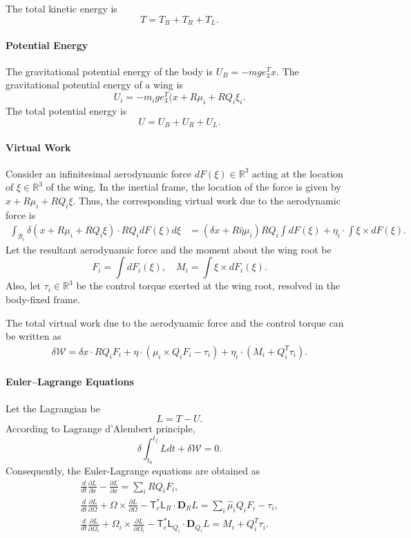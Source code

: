 \documentclass[10pt]{article}
\newcommand{\deriv}[2]{\ensuremath{\frac{\partial #1}{\partial #2}}}
\newcommand{\T}{\ensuremath{\mathsf{T}}}
\renewcommand{\L}{\ensuremath{\mathsf{L}}}
\renewcommand{\Re}{\ensuremath{\mathbb{R}}}
\newcommand{\D}{\ensuremath{\mathbf{D}}}
\begin{document}
The total kinetic energy is
\[
    T = T_B + T_R + T_L.
\]

\paragraph{Potential Energy}

The gravitational potential energy of the body is $U_B = -m g e_3^T x$. 
The gravitational potential energy of a wing is
\[
    U_i = -m_ig e_3^T (x + R\mu_i + RQ_i \xi_i.
\]
The total potential energy is
\[
    U = U_B + U_R + U_L.
\]

\paragraph{Virtual Work}

Consider an infinitesimal aerodynamic force $dF(\xi)\in\Re^3$ acting at the location of $\xi\in\Re^3$ of the wing. 
In the inertial frame, the location of the force is given by $x+ R\mu_i + R Q_i\xi$. 
Thus, the corresponding virtual work due to the aerodynamic force is
\begin{align*}
    \int_{\mathcal{B}_i} \delta(x + R\mu_i + R Q_i\xi) \cdot R Q_i dF(\xi) d\xi
                      & =  (\delta x + R\hat\eta \mu_i) R Q_i \int dF(\xi) + \eta_i \cdot \int \xi \times dF(\xi).
\end{align*}
Let the resultant aerodynamic force and the moment about the wing root be
\[
    F_i = \int dF_i(\xi) ,\quad M_i = \int \xi\times dF_i(\xi).
\]
Also, let $\tau_i\in\Re^3$ be the control torque exerted at the wing root, resolved in the body-fixed frame. 

The total virtual work due to the aerodynamic force and the control torque can be written as
\begin{align}
    \delta\mathcal{W} = \delta x \cdot R Q_i F_i + \eta\cdot (\mu_i\times Q_i F_i -\tau_i) + \eta_i \cdot ( M_i+ Q_i^T \tau_i).
\end{align}

\paragraph{Euler--Lagrange Equations}

Let the Lagrangian be
\[
    L = T - U.
\]
According to Lagrange d'Alembert principle, 
\[
    \delta \int_{t_0}^{t_f} L dt  + \delta \mathcal{W} = 0.
\]
Consequently, the Euler-Lagrange equations are obtained as 
\begin{gather*}
    \frac{d}{dt} \deriv{L}{\dot x} - \deriv{L}{x} = \sum_i R Q_i F_i,\\
    \frac{d}{dt} \deriv{L}{\Omega} + \Omega\times \deriv{L}{\Omega} - \T^*_e\L_R\cdot  \D_R L = \sum_i \hat\mu_i Q_iF_i -\tau_i,\\
    \frac{d}{dt} \deriv{L}{\Omega_i} + \Omega_i\times \deriv{L}{\Omega_i} - \T^*_e\L_{Q_i}\cdot  \D_{Q_i} L = M_i + Q_i^T \tau_i.
\end{gather*}
\end{document}
